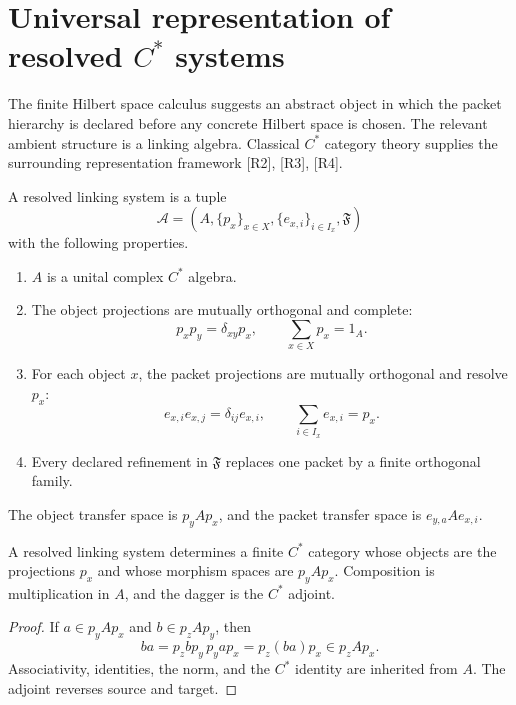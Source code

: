 \documentclass{aomart}
\theoremstyle{definition}
\theoremstyle{remark}
\newcommand{\Acal}{\mathcal A}
\newcommand{\Rcite}[1]{\textup{[#1]}}
\begin{document}
\section{Universal representation of resolved \texorpdfstring{\(C^*\)}{C star} systems}\label{sec:universal}

The finite Hilbert space calculus suggests an abstract object in which the packet hierarchy is declared before any concrete Hilbert space is chosen. The relevant ambient structure is a linking algebra. Classical \(C^*\) category theory supplies the surrounding representation framework \Rcite{R2}, \Rcite{R3}, \Rcite{R4}.

\begin{definition}\label{def:resolved_linking_system}
A resolved linking system is a tuple
\[
 \Acal
 =
 \left(
 A,
 \{p_x\}_{x\in X},
 \{e_{x,i}\}_{i\in I_x},
 \mathfrak F
 \right)
\]
with the following properties.
\begin{enumerate}[label=\textup{(L\arabic*)}]
\item \(A\) is a unital complex \(C^*\) algebra.
\item The object projections are mutually orthogonal and complete:
\[
 p_xp_y=\delta_{xy}p_x,
 \qquad
 \sum_{x\in X}p_x=1_A.
\]
\item For each object \(x\), the packet projections are mutually orthogonal and resolve \(p_x\):
\[
 e_{x,i}e_{x,j}=\delta_{ij}e_{x,i},
 \qquad
 \sum_{i\in I_x}e_{x,i}=p_x.
\]
\item Every declared refinement in \(\mathfrak F\) replaces one packet by a finite orthogonal family.
\end{enumerate}
The object transfer space is \(p_yAp_x\), and the packet transfer space is \(e_{y,a}Ae_{x,i}\).
\end{definition}

\begin{proposition}\label{prop:corner_category}
A resolved linking system determines a finite \(C^*\) category whose objects are the projections \(p_x\) and whose morphism spaces are \(p_yAp_x\). Composition is multiplication in \(A\), and the dagger is the \(C^*\) adjoint.
\end{proposition}

\begin{proof}
If \(a\in p_yAp_x\) and \(b\in p_zAp_y\), then
\[
 ba=p_zbp_y\,p_yap_x=p_z(ba)p_x\in p_zAp_x.
\]
Associativity, identities, the norm, and the \(C^*\) identity are inherited from \(A\). The adjoint reverses source and target.
\end{proof}
\end{document}
